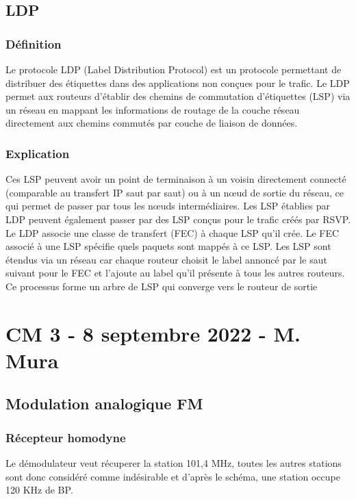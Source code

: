 \documentclass[12pt, a4paper]{article}
\begin{document}
\subsection{LDP}
    \subsubsection{Définition}
    Le protocole LDP (Label Distribution Protocol) est un protocole permettant de 
    distribuer des étiquettes dans des applications non conçues pour le trafic. Le 
    LDP permet aux routeurs d’établir des chemins de commutation d’étiquettes (LSP) 
    via un réseau en mappant les informations de routage de la couche réseau 
    directement aux chemins commutés par couche de liaison de données.\\

    \subsubsection{Explication}
    Ces LSP peuvent avoir un point de terminaison à un voisin directement connecté 
    (comparable au transfert IP saut par saut) ou à un nœud de sortie du réseau, 
    ce qui permet de passer par tous les nœuds intermédiaires. Les LSP établies par 
    LDP peuvent également passer par des LSP conçus pour le trafic créés par RSVP.\\

    Le LDP associe une classe de transfert (FEC) à chaque LSP qu’il crée. Le FEC 
    associé à une LSP spécifie quels paquets sont mappés à ce LSP. Les LSP sont 
    étendus via un réseau car chaque routeur choisit le label annoncé par le 
    saut suivant pour le FEC et l’ajoute au label qu’il présente à tous les 
    autres routeurs. Ce processus forme un arbre de LSP qui converge vers le
    routeur de sortie\\


\newpage
\section{CM 3 - 8 septembre 2022 - M. Mura}
\subsection{Modulation analogique FM}
    \subsubsection{Récepteur homodyne}
    Le démodulateur veut récuperer la station 101,4 MHz, toutes les autres 
    stations sont donc considéré comme indésirable et d'après le schéma, une
    station occupe 120 KHz de BP.
\end{document}
